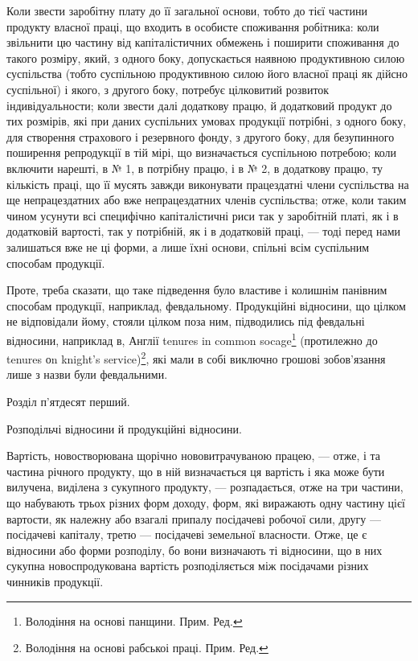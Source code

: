 \parcont{}  %
Коли звести заробітну плату до її загальної основи, тобто до тієї частини
продукту власної праці, що входить в особисте споживання робітника: коли
звільнити цю частину від капіталістичних обмежень і поширити споживання до
такого розміру, який, з одного боку, допускається наявною продуктивною силою
суспільства (тобто суспільною продуктивною силою його власної праці як дійсно
суспільної) і якого, з другого боку, потребує цілковитий розвиток індивідуальности; коли звести далі
додаткову працю, й додатковий продукт до тих розмірів,
які при даних суспільних умовах продукції потрібні, з одного боку, для створення
страхового і резервного фонду, з другого боку, для безупинного поширення
репродукції в тій мірі, що визначається суспільною потребою; коли включити
нарешті, в № 1, в потрібну працю, і в № 2, в додаткову працю, ту кількість
праці, що її мусять завжди виконувати працездатні члени суспільства на ще
непрацездатних або вже непрацездатних членів суспільства; отже, коли таким
чином усунути всі специфічно капіталістичні риси так у заробітній платі, як і в
додатковій вартості, так у потрібній, як і в додатковій праці, — тоді перед
нами залишаться вже не ці форми, а лише їхні основи, спільні всім суспільним
способам продукції.

Проте, треба сказати, що таке підведення було властиве і колишнім панівним
способам продукції, наприклад, февдальному. Продукційні відносини, що
цілком не відповідали йому, стояли цілком поза ним, підводились під февдальні
відносини, наприклад в, Англії tenures in common socage\footnote*{
Володіння на основі панщини. Прим. Ред.
} (протилежно до tenures
оn knight’s service)\footnote*{
Володіння на основі рабськоі праці. Прим. Ред.
}, які мали в собі виключно грошові зобов’язання
лише з назви були февдальними.

Розділ п’ятдесят перший.

Розподільчі відносини й продукційні відносини.

Вартість, новостворювана щорічно нововитрачуваною працею, — отже, і та
частина річного продукту, що в ній визначається ця вартість і яка може бути
вилучена, виділена з сукупного продукту, — розпадається, отже на три частини,
що набувають трьох різних форм доходу, форм, які виражають одну частину
цієї вартости, як належну або взагалі припалу посідачеві робочої
сили, другу — посідачеві капіталу, третю — посідачеві земельної власности.
Отже, це є відносини або форми розподілу, бо вони визначають ті відносини,
що в них сукупна новоспродукована вартість розподіляється між посідачами
різних чинників продукції.

